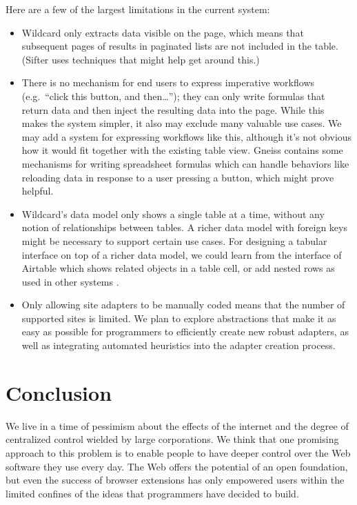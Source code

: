 \documentclass[english,submission]{programming}
\providecommand{\tightlist}{%
  \setlength{\itemsep}{0pt}\setlength{\parskip}{0pt}}
\begin{document}
Here are a few of the largest limitations in the current system:

\begin{itemize}
\tightlist
\item
  Wildcard only extracts data visible on the page, which means that
  subsequent pages of results in paginated lists are not included in the
  table. (Sifter \autocite{huynh2006} uses techniques that might help
  get around this.)
\item
  There is no mechanism for end users to express imperative workflows
  (e.g.~``click this button, and then\ldots{}''); they can only write
  formulas that return data and then inject the resulting data into the
  page. While this makes the system simpler, it also may exclude many
  valuable use cases. We may add a system for expressing workflows like
  this, although it's not obvious how it would fit together with the
  existing table view. Gneiss \autocite{chang2014} contains some
  mechanisms for writing spreadsheet formulas which can handle behaviors
  like reloading data in response to a user pressing a button, which
  might prove helpful.
\item
  Wildcard's data model only shows a single table at a time, without any
  notion of relationships between tables. A richer data model with
  foreign keys might be necessary to support certain use cases. For
  designing a tabular interface on top of a richer data model, we could
  learn from the interface of Airtable which shows related objects in a
  table cell, or add nested rows as used in other systems
  \autocite{mccutchen2016,bakke2016}.
\item
  Only allowing site adapters to be manually coded means that the number
  of supported sites is limited. We plan to explore abstractions that
  make it as easy as possible for programmers to efficiently create new
  robust adapters, as well as integrating automated heuristics into the
  adapter creation process.
\end{itemize}

\hypertarget{conclusion}{%
\section{Conclusion}\label{conclusion}}

We live in a time of pessimism about the effects of the internet and the
degree of centralized control wielded by large corporations. We think
that one promising approach to this problem is to enable people to have
deeper control over the Web software they use every day. The Web offers
the potential of an open foundation, but even the success of browser
extensions has only empowered users within the limited confines of the
ideas that programmers have decided to build.
\end{document}
